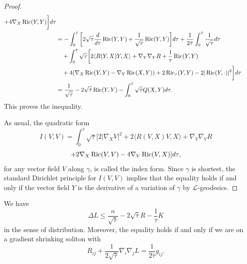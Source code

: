 \begin{proof}
\begin{align*}
+4\nabla_X \operatorname{Ric}(Y,Y)\bigg]d\tau\\
& =-\int_0^{\bar{\tau}}\bigg[2\sqrt{\tau}\frac{d}{d\tau}\operatorname{Ric}(Y,Y)
+\frac{1}{\sqrt{\tau}}\operatorname{Ric}(Y,Y)\bigg]d\tau+\frac{1}{2\bar\tau}
\int_0^{\bar{\tau}}\frac{1}{\sqrt{\tau}}d\tau\\
&\quad +\int_0^{\bar{\tau}}\sqrt{\tau}\bigg[2\langle
R(Y,X)Y,X\rangle
+\nabla_Y\nabla_YR+\frac{1}{\tau}\operatorname{Ric}(Y,Y)\\
&\quad +4(\nabla_X \operatorname{Ric}(Y,Y)-\nabla_Y \operatorname{Ric}(X,Y))+2\operatorname{Ric}_\tau(Y,Y)
-2|\operatorname{Ric}(Y,\cdot)|^2\bigg]d\tau\\
& =\frac{1}{\sqrt{\bar{\tau}}}-2\sqrt{\bar{\tau}}\operatorname{Ric}(Y,Y)
-\int_0^{\bar{\tau}}\sqrt{\tau}Q(X,Y)d\tau.
\end{align*}
This proves the inequality.

As usual, the quadratic form
$$
I(V,V)=\int_0^{\bar{\tau}}\sqrt{\tau}[2 |\nabla_XV|^2 +2\langle
R(V,X)V,X\rangle+\nabla_V\nabla_VR
$$
$$
+2\nabla_X \operatorname{Ric}(V,V)-4\nabla_V \operatorname{Ric}(V,X)]d\tau,
$$
for any vector field $V$ along $\gamma$, is called the index form.
Since $\gamma$ is shortest, the standard Dirichlet principle for
$I(V,V)$ implies that the equality holds if and only if the vector
field $Y$ is the derivative of a variation of $\gamma$ by
$\mathcal{L}$-geodesics.
\end{proof}

\begin{corollary}
  \label{cor:cz-distributional-comparison-for-reduced-distance}
We have
$$
\Delta L\leq\frac{n}{\sqrt{\bar{\tau}}}
-2\sqrt{\bar{\tau}}R-\frac{1}{\bar{\tau}}K
$$
in the sense of distribution. Moreover, the equality holds if and
only if we are on a gradient shrinking soliton with
$$
R_{ij}+\frac{1}{2\sqrt{\bar\tau}}\nabla_i\nabla_jL
=\frac{1}{2\bar\tau}g_{ij}.$$
\end{corollary}


